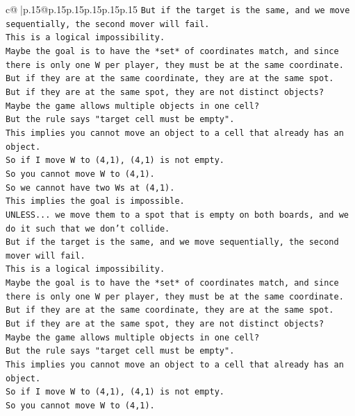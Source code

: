 \documentclass{article}
\begin{document}
{\begin{supertabular}{c@{$\;$}|p{.15\linewidth}@{}p{.15\linewidth}p{.15\linewidth}p{.15\linewidth}p{.15\linewidth}p{.15\linewidth}}
{{{\texttt{But if the target is the same, and we move sequentially, the second mover will fail.} \\
\texttt{This is a logical impossibility.} \\
\texttt{Maybe the goal is to have the *set* of coordinates match, and since there is only one W per player, they must be at the same coordinate.} \\
\texttt{But if they are at the same coordinate, they are at the same spot.} \\
\texttt{But if they are at the same spot, they are not distinct objects?} \\
\texttt{Maybe the game allows multiple objects in one cell?} \\
\texttt{But the rule says "target cell must be empty".} \\
\texttt{This implies you cannot move an object to a cell that already has an object.} \\
\texttt{So if I move W to (4,1), (4,1) is not empty.} \\
\texttt{So you cannot move W to (4,1).} \\
\texttt{So we cannot have two Ws at (4,1).} \\
\texttt{This implies the goal is impossible.} \\
\texttt{UNLESS... we move them to a spot that is empty on both boards, and we do it such that we don't collide.} \\
\texttt{But if the target is the same, and we move sequentially, the second mover will fail.} \\
\texttt{This is a logical impossibility.} \\
\texttt{Maybe the goal is to have the *set* of coordinates match, and since there is only one W per player, they must be at the same coordinate.} \\
\texttt{But if they are at the same coordinate, they are at the same spot.} \\
\texttt{But if they are at the same spot, they are not distinct objects?} \\
\texttt{Maybe the game allows multiple objects in one cell?} \\
\texttt{But the rule says "target cell must be empty".} \\
\texttt{This implies you cannot move an object to a cell that already has an object.} \\
\texttt{So if I move W to (4,1), (4,1) is not empty.} \\
\texttt{So you cannot move W to (4,1).} \\
}}}
\end{supertabular}}
\end{document}
